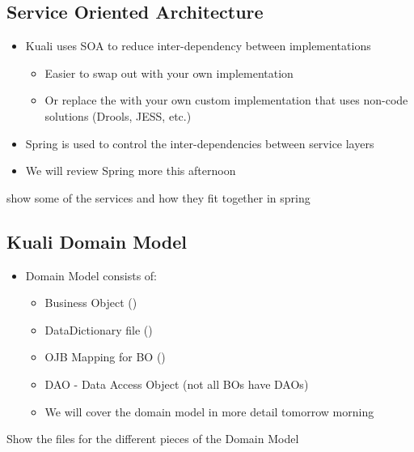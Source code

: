 \begin{ifhtml}
\begin{s5slide}
        \section{Service Oriented Architecture}
            \begin{itemize}
                \item Kuali uses SOA to reduce inter-dependency between implementations
                \begin{itemize}
                    \item Easier to swap out  with your own implementation
                    \item Or replace the  with your own custom implementation that uses non-code solutions (Drools, JESS, etc.)
                \end{itemize}
                \item Spring is used to control the inter-dependencies between service layers
                \item We will review Spring more this afternoon
            \end{itemize}
            \begin{s5notes}
                show some of the services and how they fit together in spring
            \end{s5notes}
    \end{s5slide}
    \begin{s5slide}
        \section{Kuali Domain Model}
            \begin{itemize}
                \item Domain Model consists of:
                \begin{itemize}
                    \item Business Object ()
                    \item DataDictionary file ()
                    \item OJB Mapping for BO ()
                    \item DAO - Data Access Object (not all BOs have DAOs)
                    \item We will cover the domain model in more detail tomorrow morning
                    
                \end{itemize}
            \end{itemize}
        \begin{s5notes}
            Show the files for the different pieces of the Domain Model
        \end{s5notes} 
    \end{s5slide}
    \begin{s5slide}

\end{s5slide}
\end{ifhtml}
